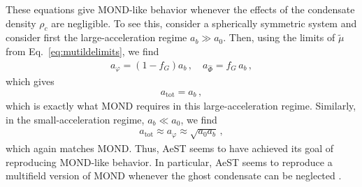 \documentclass[reprint, amsmath,amssymb, nofootinbib, aps, prd]{revtex4-2}
\begin{document}
These equations give MOND-like behavior whenever the effects of the condensate density $\rho_c$ are negligible.
To see this, consider a spherically symmetric system and consider first the large-acceleration regime $a_b \gg a_0$.
Then, using the limits of $\tilde{\mu}$ from Eq.~\eqref{eq:mutildelimits}, we find
\begin{align}
 a_\varphi = (1-f_G) a_b \,, \quad a_{\hat{\Phi}} = f_G \, a_b \,,
\end{align}
which gives
\begin{align}
 a_{\mathrm{tot}} = a_b \,,
\end{align}
which is exactly what MOND requires in this large-acceleration regime.
Similarly, in the small-acceleration regime, $a_b \ll a_0$, we find
\begin{align}
 a_{\mathrm{tot}} \approx a_\varphi \approx \sqrt{a_0 a_b} \,,
\end{align}
which again matches MOND.
Thus, AeST seems to have achieved its goal of reproducing MOND-like behavior.
In particular, AeST seems to reproduce a multifield version of MOND whenever the ghost condensate can be neglected \citep{Famaey2012}.
\end{document}
